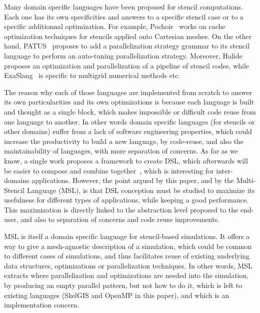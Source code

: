 
Many domain specific languages have been proposed for stencil computations. Each one has its own specificities and answers to a specific stencil case or to a specific additionnal optimization. For example, Pochoir~\cite{spaaTangCKLL11} works on cache optimization techniques for stencils applied onto Cartesian meshes. On the other hand, PATUS~\cite{citeulike12258902} proposes to add a parallelization strategy grammar to its stencil language to perform an auto-tuning parallelization strategy. Moreover, Halide~\cite{Ragan-Kelley:2013:HLC:2491956.2462176}  proposes an optimization and parallelization of a pipeline of stencil codes, while ExaSlang~\cite{Schmitt:2014:EDL:2691166.2691171} is specific to multigrid numerical methods etc.

The reason why each of those languages are implemented from scratch to answer its own particularities and its own optimizations is because each language is built and thought as a single block, which makes impossible or difficult code reuse from one language to another. In other words domain specific languages (for stencils or other domains) suffer from a lack of software engineering properties, which could increase the productivity to build a new language, by code-reuse, and also the maintainability of languages, with more separation of concerns. As far as we know, a single work proposes a framework to create DSL, which afterwards will be easier to compose and combine together~\cite{Sujeeth:2013:CRC:2524984.2524988}, which is interesting for inter-domains applications. However, the point argued by this paper, and by the Multi-Stencil Language (MSL), is that DSL conception must be studied to maximize its usefulness for different types of applications, while keeping a good performance. This maximization is directly linked to the abstraction level proposed to the end-user, and also to separation of concerns and code reuse improvements.

MSL is itself a domain specific language for stencil-based simulations. It offers a way to give a mesh-agnostic description of a simulation, which could be common to different cases of simulations, and thus facilitates reuse of existing underlying data structures, optimizations or parallelization techniques. In other words, MSL extracts where parallelization and optimizations are needed into the simulation, by producing an empty parallel pattern, but not how to do it, which is left to existing languages (SkelGIS and OpenMP in this paper), and which is an implementation concern.

